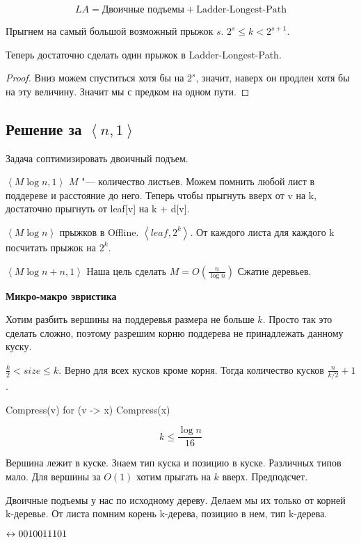 \[ LA = \text{Двоичные подъемы} + \text{Ladder-Longest-Path} \]

Прыгнем на самый большой возможный прыжок $s$. $2^s \le k < 2^{s + 1}$.

Теперь достаточно сделать один прыжок в Ladder-Longest-Path.
\begin{proof}
Вниз можем спуститься хотя бы на $2^s$, значит, наверх он продлен хотя бы на эту величину.
Значит мы с предком на одном пути.
\end{proof}

\subsection{Решение за \texorpdfstring{$\left<n, 1\right>$}{<n, 1>}}
Задача  соптимизировать двоичный подъем.

$\left<M\log n, 1\right>$
$M$ "--- количество листьев. Можем помнить любой лист в поддереве  и расстояние до него. Теперь чтобы прыгнуть вверх от v на k, достаточно 
прыгнуть от leaf[v] на k + d[v].

$\left<M\log n\right>$ прыжков в Offline. $\left<leaf, 2^k\right>$. От каждого листа для каждого k посчитать прыжок на $2^k$.

$\left<M\log n + n, 1\right>$
Наша цель сделать $M = O(\frac{n}{\log n})$
Сжатие деревьев.


\textbf{Микро-макро эвристика}

Хотим разбить вершины на поддеревья размера не больше $k$.
Просто так это сделать сложно, поэтому разрешим корню поддерева не принадлежать данному куску.

$\frac{k}{2} < size \le k$. Верно для всех кусков кроме корня.
Тогда количество кусков $\frac{n}{k/2} + 1$.


\begin{cppcode}
Compress(v) {
    for (v -> x) Compress(x)
}
\end{cppcode}

\[ k \le \frac{\log n}{16} \]

Вершина лежит в куске.
Знаем тип куска и позицию в куске.
Различных типов мало.
Для вершины за $O(1)$ хотим прыгать на $k$ вверх.
Предподсчет.

Двоичные подъемы у нас по исходному дереву. Делаем мы их только от корней k-деревье. От листа помним корень k-дерева, позицию в нем, тип k-дерева. 


$\leftrightarrow 0010011101$
